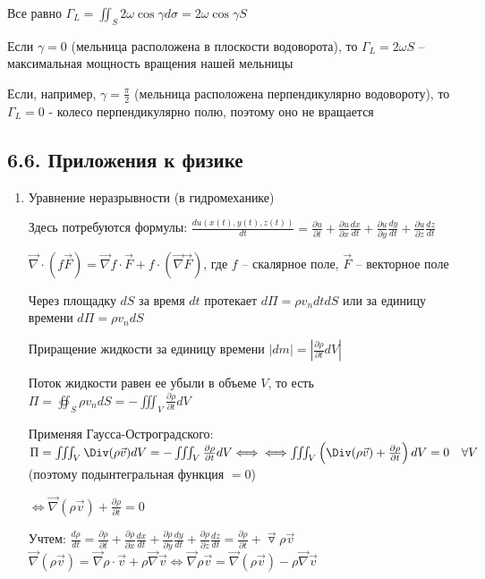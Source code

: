 \documentclass[12pt]{article}
\begin{document}
    Все равно $\Gamma_L = \iint_S 2\omega \cos \gamma d\sigma = 2\omega\cos \gamma S$

    Если $\gamma = 0$ (мельница расположена в плоскости водоворота), то $\Gamma_L = 2\omega S$ -- максимальная мощность вращения нашей мельницы

    Если, например, $\gamma = \frac{\pi}{2}$ (мельница расположена перпендикулярно водовороту), то $\Gamma_L = 0$ - колесо перпендикулярно полю, поэтому оно не вращается

    \subsection{6.6. Приложения к физике}

    \begin{enumerate}[label*=\arabic** ]
        \item Уравнение неразрывности (в гидромеханике)

        \Nota Здесь потребуются формулы:
        $\frac{du(x(t), y(t), z(t))}{dt} = \frac{\partial u}{\partial t} + \frac{\partial u}{\partial x}\frac{dx}{dt} + \frac{\partial u}{\partial y}\frac{dy}{dt} + \frac{\partial u}{\partial z}\frac{dz}{dt}$

        $\vec\nabla \cdot (f\vec{F}) = \vec\nabla f \cdot \vec{F} + f \cdot (\vec\nabla \vec{F})$, где $f$ -- скалярное поле, $\vec{F}$ -- векторное поле


        Через площадку $dS$ за время $dt$ протекает $d\Pi = \rho v_n dt dS$ или за единицу времени $d\Pi = \rho v_n dS$

        Приращение жидкости за единицу времени $|dm| = \left|\frac{\partial \rho}{\partial t} dV\right|$

        Поток жидкости равен ее убыли в объеме $V$, то есть $\Pi = \oiint_S \rho v_n dS = -\iiint_V \frac{\partial \rho}{\partial t} dV$

        Применяя \Ths Гаусса-Остроградского: $\Pi = \iiint_V \Div (\rho \vec{v}) dV = -\iiint_V \frac{\partial \rho}{\partial t} dV \Longleftrightarrow \\
        \Longleftrightarrow \iiint_V \left(\Div (\rho \vec{v}) + \frac{\partial \rho}{\partial t}\right) dV = 0 \quad \forall V$ (поэтому подынтегральная функция $= 0$)

        $\Longleftrightarrow \vec\nabla (\rho \vec{v}) + \frac{\partial \rho}{\partial t} = 0$


    Учтем: $\frac{d \rho}{dt} = \frac{\partial \rho}{\partial t} +  \frac{\partial \rho}{\partial x} \frac{dx}{dt} +  \frac{\partial \rho}{\partial y} \frac{dy}{dt} + \frac{\partial \rho}{\partial z} \frac{dz}{dt} = \frac{\partial \rho}{\partial t} + \overrightarrow{\triangledown} \rho \overrightarrow{v}$
        $\vec\nabla (\rho \vec{v}) = \vec\nabla \rho \cdot \vec{v} + \rho \vec\nabla \vec{v} \Longleftrightarrow \vec\nabla \rho \vec{v} = \vec\nabla (\rho \vec{v}) - \rho \vec\nabla \vec{v}$


\end{enumerate}
\end{document}
